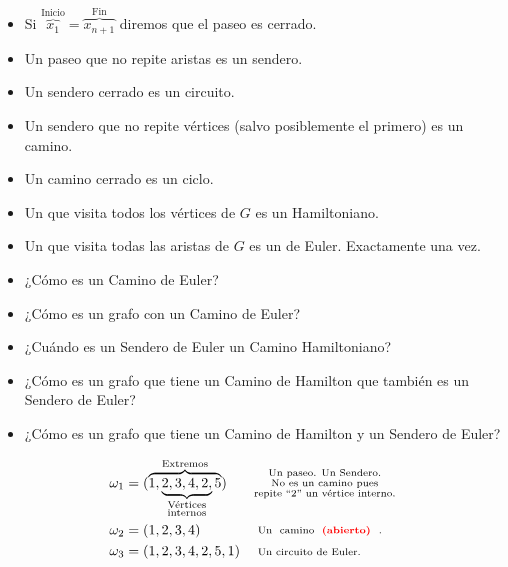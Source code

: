 \documentclass[../main.tex]{subfiles}
\begin{document}
\begin{itemize}
	\item Si
	\(
		\overbrace
		{
			x_1
		}^
		{
			\text{Inicio}
		}
		=
		\overbrace
		{
			x_{n+1}
		}^
		{
			\text{Fin}
		}
	\)
	diremos que el paseo es cerrado.

	\item Un paseo que no repite aristas es un sendero.
	\item Un sendero cerrado es un circuito.
	\item Un sendero que no repite vértices
		(salvo posiblemente el primero) es un camino.
	\item Un camino cerrado es un ciclo.
	\item Un  que visita todos los vértices de $G$ es
		un  Hamiltoniano.
	\item Un  que visita todas las aristas de $G$
		es un  de Euler.
		Exactamente una vez.
\end{itemize}

\observacion
\begin{itemize}
	\item ¿Cómo es un Camino de Euler?
	\item ¿Cómo es un grafo con un Camino de Euler?
	\item ¿Cuándo es un Sendero de Euler un Camino Hamiltoniano?
	\item ¿Cómo es un grafo que tiene un Camino de Hamilton que también es un
		Sendero de Euler?
	\item ¿Cómo es un grafo que tiene un Camino de Hamilton y un Sendero de
		Euler?
\end{itemize}

\begin{figure}[H]
	\centering
	
\end{figure}

\begin{align*}
	\omega_1 &=
	(
		\overbrace
		{
			1,
			\underbrace
			{
				2,
				3,
				4,
				2,
			}_
			{
				\substack
				{
					\text{Vértices}\\
					\text{internos}
				}
			}
			5
		}^
		{
			\text{Extremos}
		}
	)
	&& \substack
	{
		\text{Un paseo. Un Sendero.}\\
		\text{No es un camino pues}\\
		\text{repite ``2'' un vértice interno.}
	}
	\\
	\omega_2 &= (1,2,3,4)
	&& \substack
	{
		\text{ Un \dobledef{camino}{abierto}.}
	}
	\\
	\omega_3 &= (1,2,3,4,2,5,1)
	&& \substack
	{
		\text{ Un circuito de Euler.}
	}
\end{align*}
\end{document}
